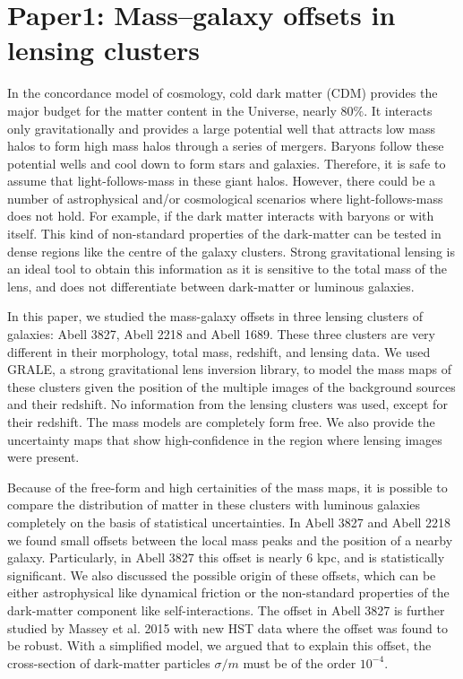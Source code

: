 \chapter{Paper1: Mass–galaxy offsets in lensing clusters}\label{paper:massgalaxyoffsets}

In the concordance model of cosmology, cold dark matter (CDM) provides the major
budget for the matter content in the Universe, nearly 80$\%$. 
It interacts only gravitationally and provides a large potential well that
attracts low mass halos to form high mass halos
through a series of mergers. Baryons follow these potential wells
and cool down to form stars and galaxies. Therefore, it is safe to assume
that light-follows-mass in these giant halos. However, there could be a number of
astrophysical and/or cosmological scenarios where light-follows-mass does not hold. 
For example, if the dark matter interacts with baryons or with itself. This
kind of non-standard properties of the dark-matter can be tested in 
dense regions like the centre of the galaxy clusters. Strong gravitational lensing is 
an ideal tool to obtain this information as it is sensitive to the total
mass of the lens, and does not differentiate between dark-matter or luminous
galaxies.

In this paper, we studied the mass-galaxy offsets in three lensing clusters of galaxies:
Abell 3827, Abell 2218 and Abell 1689. These three clusters are very different in 
their morphology, total mass, redshift, and lensing data. We used GRALE, a strong
gravitational lens inversion library, to model the mass maps of these clusters given
the position of the multiple images of the background sources 
and their redshift. No information
from the lensing clusters was used, except for their redshift. The
mass models are completely form free. We also provide the uncertainty
maps that show high-confidence in the region where lensing images were present. 

Because of the free-form and high certainities of the mass maps, 
it is possible to compare the distribution
of matter in these clusters with luminous galaxies
completely on the basis of statistical uncertainties. In Abell 3827 and
Abell 2218 we found small offsets between the local mass peaks and the
position of a nearby galaxy. Particularly, in Abell 3827 this offset is nearly 6 kpc,
and is statistically significant. We also discussed the possible origin 
of these offsets, which can be either astrophysical like dynamical
friction or the non-standard properties of the dark-matter component like
self-interactions. 
The offset in Abell 3827 is further studied by Massey et al. 2015 with new HST
data where the offset was found to be robust. With a simplified model, we argued that
to explain this offset, the cross-section of dark-matter particles 
$\sigma/m$ must be of the order $10^{-4}$.

